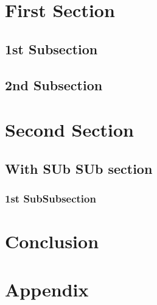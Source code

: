 \documentclass{article}
\begin{document}
 

\section{First Section}\cite{Dummy1}
    \lipsum[1]
    \subsection{1st Subsection}
        \lipsum[2]
    \subsection{2nd Subsection}
        \lipsum[3]


\section{Second Section}
    \lipsum[4]
    \subsection{With SUb SUb section}
        \lipsum[5]
        \subsubsection{1st SubSubsection}
            \lipsum[6]

\section{Conclusion}
    \lipsum[7]

\newpage
{}



\section*{Appendix}
    \lipsum[7]
\end{document}
